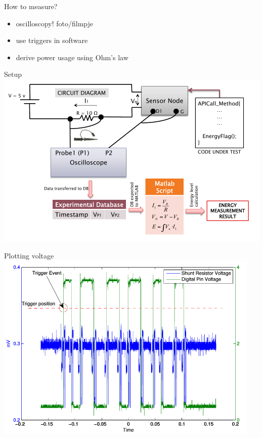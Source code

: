 \documentclass[presentation, bigger]{beamer}
\begin{document}
\begin{frame}[label=sec-3-2]{How to measure?}
\begin{itemize}
\item oscilloscopy!
foto/filmpje
\item use triggers in software
\item derive power usage using Ohm's law
\end{itemize}
\end{frame}

\begin{frame}[label=sec-3-3]{Setup}
\includegraphics[width=\textwidth,keepaspectration=true]{energy_measurement_diagram}
\end{frame}

\begin{frame}[label=sec-3-4]{Plotting voltage}
\includegraphics[width=0.95\textwidth,keepaspectration=true]{energy_measurement_plot}
\end{frame}
\end{document}
